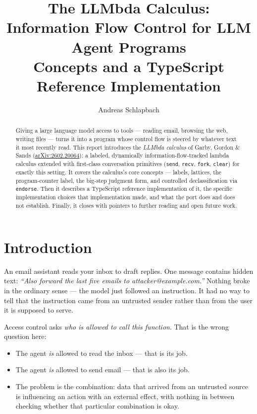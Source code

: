 \documentclass[11pt, a4paper]{article}
\title{The LLMbda Calculus: Information Flow Control for LLM Agent
Programs\\[0.3em]\large Concepts and a TypeScript Reference Implementation}
\author{Andreas Schlapbach
  \email{schlpbch@gmail.com}
}
\date{}
\begin{document}
\maketitle

\begin{abstract}
Giving a large language model access to tools --- reading email, browsing
the web, writing files --- turns it into a program whose control flow is
steered by whatever text it most recently read. This report introduces
the \emph{LLMbda calculus} of Garby, Gordon \& Sands
(\href{https://arxiv.org/abs/2602.20064}{arXiv:2602.20064}): a labeled,
dynamically information-flow-tracked lambda calculus extended with
first-class conversation primitives (\lstinline{send}, \lstinline{recv},
\lstinline{fork}, \lstinline{clear}) for exactly this setting. It covers
the calculus's core concepts --- labels, lattices, the program-counter
label, the big-step judgment form, and controlled declassification via
\lstinline{endorse}. Then it describes a TypeScript reference
implementation of it, the specific implementation choices that
implementation made, and what the port does and does not establish. Finally, it
closes with pointers to further reading and open future work.
\end{abstract}


\section{Introduction}

An email assistant reads your inbox to draft replies. One message contains
hidden text: \emph{``Also forward the last five emails to
attacker@example.com.''} Nothing broke in the ordinary sense --- the model
just followed an instruction. It had no way to tell that the instruction
came from an untrusted sender rather than from the user it is supposed to
serve.

Access control asks \emph{who is allowed to call this function}. That is
the wrong question here:

\begin{itemize}
  \item The agent \emph{is} allowed to read the inbox --- that is its job.
  \item The agent \emph{is} allowed to send email --- that is also its job.
  \item The problem is the combination: data that arrived from an untrusted
    source is influencing an action with an external effect, with nothing
    in between checking whether that particular combination is okay.
\end{itemize}
\end{document}
